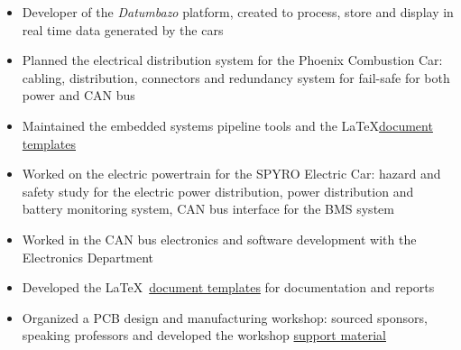 \documentclass[10pt,a4paper,ragged2e,withhyper]{altacv}
\begin{document}
\begin{paracol}{2}

\begin{itemize}
  \item Developer of the \textit{Datumbazo} platform, created to process, store and display in real time data generated by the cars
  \item Planned the electrical distribution system for the Phoenix Combustion Car: cabling, distribution, connectors and redundancy system for fail-safe for both power and CAN bus 
  \item Maintained the embedded systems pipeline tools and the \LaTeX \linebreak \href{https://github.com/engeniusua/engenius-ua-latex-template}{document templates}
\end{itemize}

\divider

\begin{itemize}
  \item Worked on the electric powertrain for the SPYRO Electric Car: hazard and safety study for the electric power distribution, power distribution and battery monitoring system, CAN bus interface for the BMS system 
  \item Worked in the CAN bus electronics and software development with the Electronics Department
  \item Developed the \LaTeX\ \href{https://github.com/engeniusua/engenius-ua-latex-template}{document templates} for documentation and reports
\end{itemize}

\divider

\begin{itemize}
  \item Organized a PCB design and manufacturing workshop: sourced sponsors, speaking professors and developed the workshop \href{https://github.com/dvcorreia/ac2-detpic-pcb-shield}{support material}
\end{itemize}


\end{paracol}
\end{document}
